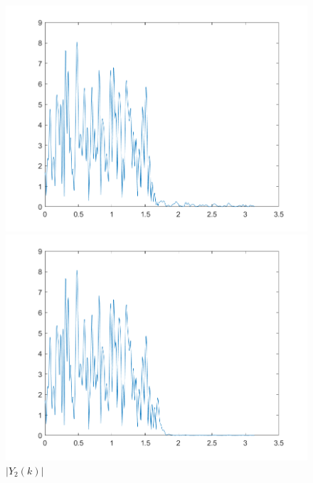 \documentclass{../source/zjureport}
\begin{document}
            \begin{figure}[H]
                \centering
                \begin{minipage}[H]{0.32\textwidth}
                    \centering
                    \includegraphics[width=\textwidth]{figure/Y1(k).png}
                    \caption{$|Y_1(k)|$}
                \end{minipage}
                \begin{minipage}[H]{0.32\textwidth}
                    \centering
                    \includegraphics[width=\textwidth]{figure/Y2(k).png}
                    \caption{$|Y_2(k)|$}
                \end{minipage}
                \begin{minipage}[H]{0.32\textwidth}

\end{minipage}
\end{figure}
\end{document}
